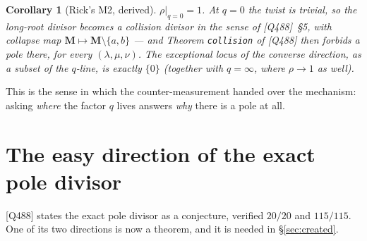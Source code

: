 \documentclass[11pt]{article}
\theoremstyle{plain}
\newtheorem{cor}[thm]{Corollary}
\theoremstyle{definition}
\theoremstyle{remark}
\theoremstyle{plain}
\newcommand{\bM}{\mathbf{M}}
\begin{document}
\begin{cor}[Rick's M2, derived]\label{cor:q0}
$\rho|_{q=0}=1$.  At $q=0$ the twist is trivial, so the long-root divisor
becomes a collision divisor in the sense of [Q488]~\S5, with collapse map
$\bM\mapsto\bM\setminus\{a,b\}$ --- and Theorem \texttt{collision} of [Q488]
then forbids a pole there, for every $(\lambda,\mu,\nu)$.  The exceptional
locus of the converse direction, as a subset of the $q$-line, is exactly
$\{0\}$ (together with $q=\infty$, where $\rho\to1$ as well).
\end{cor}

This is the sense in which the counter-measurement handed over the mechanism:
asking \emph{where} the factor $q$ lives answers \emph{why} there is a pole at
all.

\section{The easy direction of the exact pole divisor}
\label{sec:easy}

[Q488] states the exact pole divisor as a conjecture, verified $20/20$ and
$115/115$.  One of its two directions is now a theorem, and it is needed in
\S\ref{sec:created}.
\end{document}
